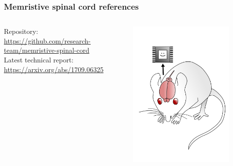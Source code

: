 \documentclass[12pt, aspectratio=169]{beamer}
\begin{document}
\begin{frame}
  \frametitle{Memristive spinal cord references}
\begin{columns}[c]

Repository:\\
\url{https://github.com/research-team/memristive-spinal-cord}\\


Latest technical report:\\
\url{https://arxiv.org/abs/1709.06325}

\begin{figure}
\includegraphics[width=1.0\linewidth]{mousebrainpink}
\end{figure}
\end{columns}
\end{frame}
\end{document}
